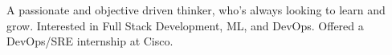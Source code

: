 

\begin{cvparagraph}

A passionate and objective driven thinker, who's always looking to learn and 
grow. Interested in Full Stack Development, ML, and DevOps. Offered a DevOps/SRE
internship at Cisco.
\end{cvparagraph}
